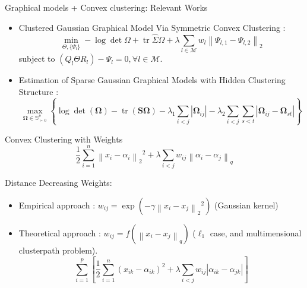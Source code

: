 \documentclass[11pt]{beamer}
\providecommand{\abs}[1]{\ensuremath{\left \lvert#1\right \rvert}}
\DeclareMathOperator*{\tr}{tr}
\def\bO{\mathbf{\Omega}}
\def\bS{\mathbf{S}}
\providecommand{\normldeux}[1]{\ensuremath{\left \lVert#1\right \rVert_2}} %
\providecommand{\normlq}[1]{\ensuremath{\left \lVert#1\right \rVert_q}} %
\begin{document}
										
										\begin{frame}{Graphical models + Convex clustering: Relevant Works}
											\begin{itemize}
												\item \textcolor{Framaprune}{Clustered Gaussian Graphical Model Via Symmetric Convex Clustering \citep{Yao2019}}:
												\begin{equation}
													\min_{\Theta, \{\Psi_l\}} -\log \det \Omega + \tr{\hat \Sigma \Omega} + \lambda \sum_{l \in \mathcal M}^{} w_l \normldeux{\Psi_{l,1} - \Psi_{l,2}} 
												\end{equation}
												subject to $(Q_l \Theta R_l) - \Psi_l = 0, \forall l \in \mathcal M.$
												
												\item \textcolor{Framaprune}{Estimation of Sparse Gaussian Graphical Models with Hidden Clustering Structure \citep{lin2020estimation}}:
												\begin{equation} 
													\operatorname{max}_{\bO \in \mathbb S_{\succ 0 }^p} \left \{ \log \det (\bO) - \tr(\bS \bO) - \lambda_1 \sum_{i<j} |\bO_{ij}| - \lambda_2 \sum_{i <j} \sum_{s < t} | \bO_{ij} - \bO_{st} | \right \}
												\end{equation}
											\end{itemize}
										\end{frame}
										
										\begin{frame}{Convex Clustering with Weights}
											\begin{equation}
												\label{eq:convex-clust}
												\frac{1}{2} \sum_{i=1}^n \normldeux{x_i - \alpha_i}^2 + \lambda \sum_{i < j} w_{ij} \normlq{\alpha_i - \alpha_j}
											\end{equation}
											
											\textcolor{Framaprune}{Distance Decreasing Weights}:
											\begin{itemize}
												\item Empirical approach \cite{Hocking2011, chi2019recovering}: $w_{ij} = \exp \left (-\gamma \normldeux{x_i - x_j}^2 \right)$ (Gaussian kernel)
												\item Theoretical approach \cite{chiquet2017fast}: $w_{ij} = f \left(\normlq{x_i - x_j} \right)$ ($\ell_1$ case, and multimensional clusterpath problem).
												\begin{equation}
													\sum_{i=1}^{p} \left[ \frac{1}{2} \sum_{i=1}^n (x_{ik} - \alpha_{ik})^2  + \lambda \sum_{i < j} w_{ij} \abs{\alpha_{ik} - \alpha_{jk}}\right] 
												\end{equation}
											\end{itemize}
										\end{frame}
										
\end{document}
